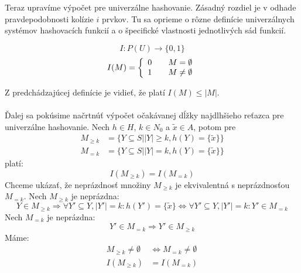 Teraz upravíme výpočet pre univerzálne hashovanie. Zásadný rozdiel je v odhade pravdepodobnosti kolízie $i$ prvkov. Tu sa oprieme o rôzne definície univerzálnych systémov hashovacích funkcií a o špecifické vlastnosti jednotlivých sád funkcií.

\begin{definition}[Indikátor]
\begin{displaymath}
I: P(U) \rightarrow \lbrace 0, 1 \rbrace
\end{displaymath}
\begin{displaymath}
I(M) = \left\{ 
\begin{array}{l l}
  0 & \quad M = \emptyset \\
  1 & \quad M \neq \emptyset \\
\end{array} \right.
\end{displaymath}
\end{definition}

Z predchádzajúcej definície je vidieť, že platí $I(M) \leq |M|$.

\paragraph{}
Ďalej sa pokúsime načrtnúť výpočet očakávanej dĺžky najdlhšieho reťazca pre univerzálne hashovanie. Nech $h \in H$, $k \in N_0$ a $\tilde{x} \in A$, potom pre
\begin{displaymath}
\begin{split}
M_{\geq k} & = \{Y \subseteq S | |Y| \geq k, h(Y) = \{\tilde{x}\}\} \\
M_{= k} & = \{Y \subseteq S | |Y| = k, h(Y) = \{\tilde{x}\}\} 
\end{split}
\end{displaymath}
platí:
\begin{displaymath}
I(M_{\geq k}) = I(M_{= k})
\end{displaymath}
Chceme ukázať, že neprázdnosť množiny $M_{\geq k}$ je ekvivalentná s neprázdnosťou $M_{= k}$. Nech $M_{\geq k}$ je neprázdna:
\begin{displaymath}
Y \in M_{\geq k} \Rightarrow \forall Y' \subseteq Y, |Y'| = k: h(Y') = \{\tilde{x}\} \Leftrightarrow \forall Y' \subseteq Y, |Y'| = k: Y' \in M_{=k}
\end{displaymath}
Nech $M_{=k}$ je neprázdna:
\begin{displaymath}
Y' \in M_{=k} \Rightarrow Y' \in M_{\geq k}
\end{displaymath}
Máme:
\begin{displaymath}
\begin{split}
M_{\geq k} \neq \emptyset & \Leftrightarrow  M_{= k} \neq \emptyset \\
I(M_{\geq k}) & = I(M_{= k})
\end{split}
\end{displaymath}

